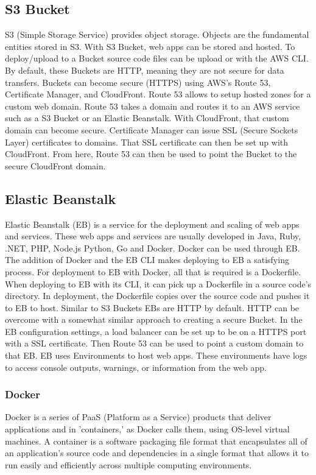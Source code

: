 \subsection{S3 Bucket}
S3 (Simple Storage Service) provides object storage. Objects are the fundamental entities stored in S3. With S3 Bucket, web apps can be stored and hosted. To deploy/upload to a Bucket source code files can be upload or with the AWS CLI. \cite{ref22} By default, these Buckets are HTTP, meaning they are not secure for data transfers. Buckets can become secure (HTTPS) using AWS's Route 53, Certificate Manager, and CloudFront. Route 53 allows to setup hosted zones for a custom web domain. Route 53 takes a domain and routes it to an AWS service such as a S3 Bucket or an Elastic Beanstalk. With CloudFront, that custom domain can become secure. Certificate Manager can issue SSL (Secure Sockets Layer) certificates to domains. That SSL certificate can then be set up with CloudFront. From here, Route 53 can then be used to point the Bucket to the secure CloudFront domain.

\subsection{Elastic Beanstalk}
Elastic Beanstalk (EB) is a service for the deployment and scaling of web apps and services. These web apps and services are usually developed in Java, Ruby, .NET, PHP, Node.js Python, Go and Docker. \cite{ref23} Docker can be used through EB. The addition of Docker and the EB CLI makes deploying to EB a satisfying process. For deployment to EB with Docker, all that is required is a Dockerfile. When deploying to EB with its CLI, it can pick up a Dockerfile in a source code's directory. In deployment, the Dockerfile copies over the source code and pushes it to EB to host. Similar to S3 Buckets EBs are HTTP by default. HTTP can be overcome with a somewhat similar approach to creating a secure Bucket. In the EB configuration settings, a load balancer can be set up to be on a HTTPS port with a SSL certificate. Then Route 53 can be used to point a custom domain to that EB. EB uses Environments to host web apps. These environments have logs to access console outputs, warnings, or information from the web app.

\subsubsection{Docker}
Docker is a series of PaaS (Platform as a Service) products that deliver applications and in 'containers,' as Docker calls them, using OS-level virtual machines. A container is a software packaging file format that encapsulates all of an application's source code and dependencies in a single format that allows it to run easily and efficiently across multiple computing environments. \cite{ref24}

